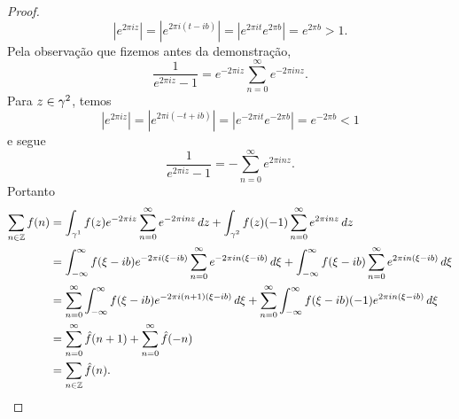 \begin{proof}
            \begin{equation*}
                |e^{2\pi i z}| = |e^{2\pi i(t - ib)}| = |e^{2\pi it}e^{2\pi b}| = e^{2\pi b} >1.
            \end{equation*}
            Pela observação que fizemos antes da demonstração,
            \begin{equation*}
             \frac{1}{e^{2\pi i z}-1} = e^{-2\pi i z}\sum_{n=0}^{\infty}e^{-2\pi i nz}.
            \end{equation*}
            Para $z \in \gamma^2$, temos
            \begin{equation*}
                |e^{2\pi i z}| = |e^{2\pi i(-t + ib)}| = |e^{-2\pi it}e^{-2\pi b}| = e^{-2\pi b} <1
            \end{equation*}
            e segue
            \begin{equation*}
                \frac{1}{e^{2\pi i z}-1} = -\sum_{n=0}^{\infty}e^{2\pi i nz}.
            \end{equation*}
            Portanto
            \begin{align*}
                \sum_{n \in \mathbb{Z}}f(n) &= \int_{\gamma^1} f(z) e^{-2\pi i z} 
                \sum_{n=0}^{\infty} e^{-2\pi i nz}\,dz 
                + \int_{\gamma^2} f(z)(-1) \sum_{n=0}^{\infty} e^{2\pi i nz}\,dz\\
                &= \int_{-\infty}^{\infty}f(\xi - ib)e^{-2\pi i (\xi - ib)}
                \sum_{n=0}^{\infty}e^{-2\pi i n(\xi - ib)}\,d\xi 
                + \int_{-\infty}^{\infty}f(\xi - ib)
                \sum_{n=0}^{\infty}e^{2\pi i n(\xi - ib)}\,d\xi \\
                &= \sum_{n=0}^{\infty} \int_{-\infty}^{\infty}f(\xi - ib)
                e^{-2\pi i (n+1)(\xi - ib)}\,d\xi 
                + \sum_{n=0}^{\infty} \int_{-\infty}^{\infty}f(\xi - ib)(-1)
                e^{2\pi i n(\xi - ib)}\,d\xi \\
                &= \sum_{n=0}^{\infty} \hat{f}(n+1) + \sum_{n=0}^{\infty} \hat{f}(-n) \\
                &= \sum_{n \in \mathbb{Z}} \hat{f}(n).
            \end{align*}
        \end{proof}
        
